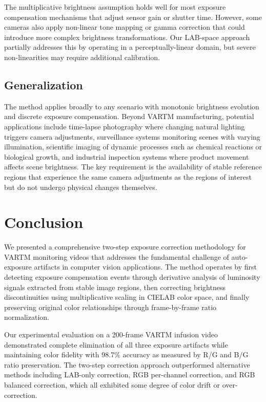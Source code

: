 \documentclass[conference]{IEEEtran}
\begin{document}
The multiplicative brightness assumption holds well for most exposure compensation mechanisms that adjust sensor gain or shutter time. However, some cameras also apply non-linear tone mapping or gamma correction that could introduce more complex brightness transformations. Our LAB-space approach partially addresses this by operating in a perceptually-linear domain, but severe non-linearities may require additional calibration.

\subsection{Generalization}

The method applies broadly to any scenario with monotonic brightness evolution and discrete exposure compensation. Beyond VARTM manufacturing, potential applications include time-lapse photography where changing natural lighting triggers camera adjustments, surveillance systems monitoring scenes with varying illumination, scientific imaging of dynamic processes such as chemical reactions or biological growth, and industrial inspection systems where product movement affects scene brightness. The key requirement is the availability of stable reference regions that experience the same camera adjustments as the regions of interest but do not undergo physical changes themselves.

\section{Conclusion}
\label{sec:conclusion}

We presented a comprehensive two-step exposure correction methodology for VARTM monitoring videos that addresses the fundamental challenge of auto-exposure artifacts in computer vision applications. The method operates by first detecting exposure compensation events through derivative analysis of luminosity signals extracted from stable image regions, then correcting brightness discontinuities using multiplicative scaling in CIELAB color space, and finally preserving original color relationships through frame-by-frame ratio normalization.

Our experimental evaluation on a 200-frame VARTM infusion video demonstrated complete elimination of all three exposure artifacts while maintaining color fidelity with 98.7\% accuracy as measured by R/G and B/G ratio preservation. The two-step correction approach outperformed alternative methods including LAB-only correction, RGB per-channel correction, and RGB balanced correction, which all exhibited some degree of color drift or over-correction.
\end{document}
